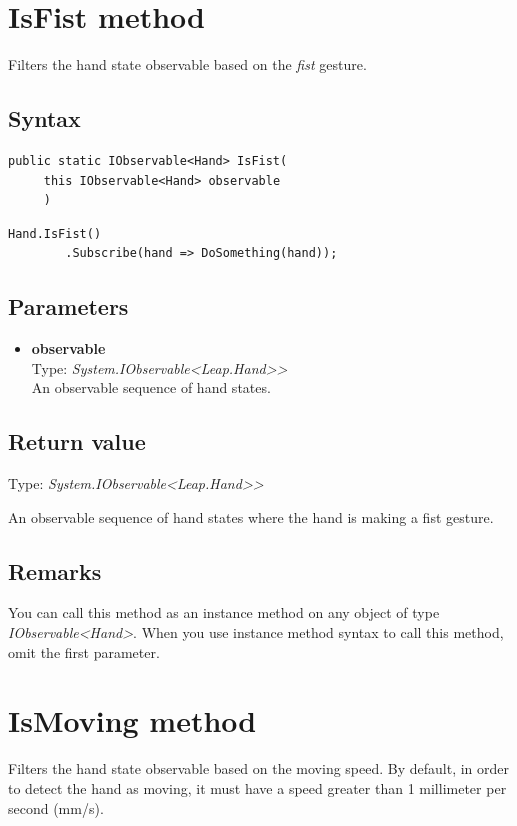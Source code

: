 \documentclass[12pt,a4paper,twoside]{report}
\begin{document}
\section{IsFist method}
Filters the hand state observable based on the \textit{fist} gesture.

\subsection{Syntax}
\begin{lstlisting}[caption=Declaration]
    public static IObservable<Hand> IsFist(
     this IObservable<Hand> observable
     )
\end{lstlisting}

\begin{lstlisting}[caption=Usage example]
    Hand.IsFist()
        .Subscribe(hand => DoSomething(hand));
\end{lstlisting}

\subsection{Parameters}
\begin{itemize}
    \item \textbf{observable}\\
    Type: \textit{System.IObservable<Leap.Hand>{}>}\\
    An observable sequence of hand states.
\end{itemize}

\subsection{Return value}
Type: \textit{System.IObservable<Leap.Hand>{}>}

An observable sequence of hand states where the hand is making a fist gesture.

\subsection{Remarks}
You can call this method as an instance method on any object of type \textit{IObservable<Hand>}. When you use 
instance method syntax to call this method, omit the first parameter.

\section{IsMoving method}
Filters the hand state observable based on the moving speed. By default, in order to detect the hand as moving, it must have a speed greater than 1 millimeter per second (mm/s).
\end{document}
